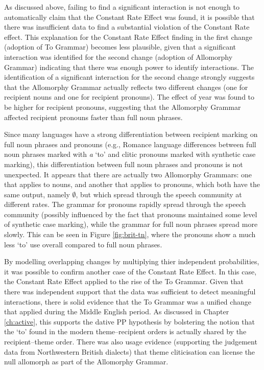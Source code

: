 	As discussed above, failing to find a significant interaction is not enough to automatically claim that the Constant Rate Effect was found, it is possible that there was insufficient data to find a substantial violation of the Constant Rate effect. This explanation for the Constant Rate Effect finding in the first change (adoption of To Grammar) becomes less plausible, given that a significant interaction was identified for the second change (adoption of Allomorphy Grammar) indicating that there was enough power to identify interactions. The identification of a significant interaction for the second change strongly suggests that the Allomorphy Grammar actually reflects two different changes (one for recipient nouns and one for recipient pronouns). The effect of year was found to be higher for recipient pronouns, suggesting that the Allomorphy Grammar affected recipient pronouns faster than full noun phrases.
	
	Since many languages have a strong differentiation between recipient marking on full noun phrases and pronouns (e.g., Romance language differences between full noun phrases marked with \textit{a} `to' and clitic pronouns marked with synthetic case marking), this differentiation between full noun phrases and pronouns is not unexpected. It appears that there are actually two Allomorphy Grammars: one that applies to nouns, and another that applies to pronouns, which both have the same output, namely $\emptyset$, but which spread through the speech community at different rates. The grammar for pronouns rapidly spread through the speech community (possibly influenced by the fact that pronouns maintained some level of synthetic case marking), while the grammar for full noun phrases spread more slowly. This can be seen in Figure \ref{fig:brit-tn}, where the pronouns show a much less `to' use overall compared to full noun phrases.

	By modelling overlapping changes by multiplying thier independent probabilities, it was possible to confirm another case of the Constant Rate Effect. In this case, the Constant Rate Effect applied to the rise of the To Grammar. Given that there was independent support that the data was sufficient to detect meaningful interactions, there is solid evidence that the To Grammar was a unified change that applied during the Middle English period. As discussed in Chapter \ref{ch:active}, this supports the dative PP hypothesis by bolstering the notion that the `to' found in the modern theme--recipient orders is actually shared by the recipient--theme order. There was also usage evidence (supporting the judgement data from Northwestern British dialects) that theme cliticisation can license the null allomorph as part of the Allomorphy Grammar.
	
